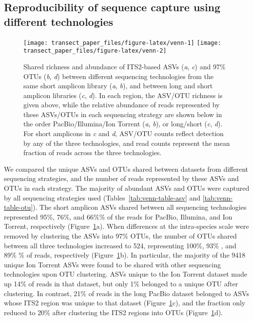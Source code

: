 \documentclass[
  12pt,
]{article}
\begin{document}
\hypertarget{reproducibility-of-sequence-capture-using-different-technologies}{%
\subsection{Reproducibility of sequence capture using different technologies}\label{reproducibility-of-sequence-capture-using-different-technologies}}







\begin{figure}

{\centering \texttt{[image: transect\_paper\_files/figure-latex/venn-1]} \texttt{[image: transect\_paper\_files/figure-latex/venn-2]} 

}

\caption[Shared richness and abundance of ASVs and OTUs between different sequencing technologies]{Shared richness and abundance of ITS2-based ASVs (\emph{a}, \emph{c}) and 97\% OTUs (\emph{b}, \emph{d}) between different sequencing technologies from the same short amplicon library (\emph{a}, \emph{b}), and between long and short amplicon libraries (\emph{c}, \emph{d}).
In each region, the ASV/OTU richness is given above, while the relative abundance of reads represented by these ASVs/OTUs in each sequencing strategy are shown below in the order PacBio/Illumina/Ion Torrent (\emph{a}, \emph{b}), or long/short (\emph{c}, \emph{d}).
For short amplicons in \emph{c} and \emph{d}, ASV/OTU counts reflect detection by any of the three technologies, and read counts represent the mean fraction of reads across the three technologies.}\label{fig:venn}
\end{figure}

We compared the unique ASVs and OTUs shared between datasets from different sequencing strategies, and the number of reads represented by these ASVs and OTUs in each strategy.
The majority of abundant ASVs and OTUs were captured by all sequencing strategies used (Tables~\ref{tab:venn-table-asv} and \ref{tab:venn-table-otu}).
The short amplicon ASVs shared between all sequencing technologies represented 95\%, 76\%, and 66\%\% of the reads for PacBio, Illumina, and Ion Torrent, respectively (Figure~\ref{fig:venn}a).
When differences at the intra-species scale were removed by clustering the ASVs into 97\% OTUs, the number of OTUs shared between all three technologies increased to 524, representing 100\%, 93\% , and 89\% \% of reads, respectively (Figure~\ref{fig:venn}b).
In particular, the majority of the 9418 unique Ion Torrent ASVs were found to be shared with other sequencing technologies upon OTU clustering.
ASVs unique to the Ion Torrent dataset made up 14\% of reads in that dataset, but only 1\% belonged to a unique OTU after clustering.
In contrast, 21\% of reads in the long PacBio dataset belonged to ASVs whose ITS2 region was unique to that dataset (Figure~\ref{fig:venn}c), and the fraction only reduced to 20\% after clustering the ITS2 regions into OTUs (Figure~\ref{fig:venn}d).
\end{document}

